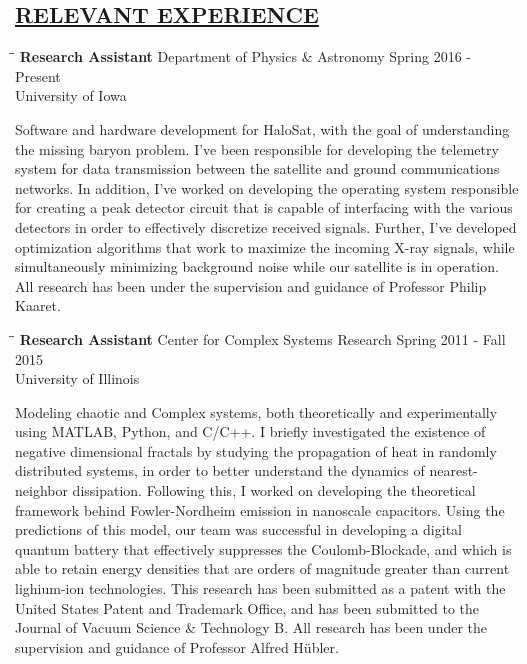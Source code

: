\documentclass{res}
\begin{document}
\begin{resume}
\section{\underline{RELEVANT EXPERIENCE}}
\vspace{1.5mm}
   \begin{tabbing}
   \hspace{1.75in}\= \hspace{2.75in}\= \kill %
    {\bf Research Assistant} \> Department of Physics \& Astronomy\> Spring 2016 - Present\\
                             \> University of Iowa
   \end{tabbing}\vspace{-18pt}      %
   Software and hardware development for HaloSat, with the goal of understanding the missing baryon problem. I've been responsible for developing the telemetry system for data transmission between the satellite and ground communications networks. In addition, I've worked on developing the operating system responsible for creating a peak detector circuit that is capable of interfacing with the various detectors in order to effectively discretize received signals. Further, I've developed optimization algorithms that work to maximize the incoming X-ray signals, while simultaneously minimizing background noise while our satellite is in operation. All research has been under the supervision and guidance of Professor Philip Kaaret.
   \vspace{-1mm}
   \begin{tabbing}
   \hspace{1.75in}\= \hspace{2.75in}\= \kill %
    {\bf Research Assistant} \>Center for Complex Systems Research \> Spring 2011 - Fall 2015\\
                             \>University of Illinois
   \end{tabbing}\vspace{-18pt}      %
    Modeling chaotic and Complex systems, both theoretically and experimentally using MATLAB, Python, and C/C++. I briefly investigated the existence of negative dimensional fractals by studying the propagation of heat in randomly distributed systems, in order to better understand the dynamics of nearest-neighbor dissipation. Following this, I worked on developing the theoretical framework behind Fowler-Nordheim emission in nanoscale capacitors. Using the predictions of this model, our team was successful in developing a digital quantum battery that effectively suppresses the Coulomb-Blockade, and which is able to retain energy densities that are orders of magnitude greater than current lighium-ion technologies. This research has been submitted as a patent with the United States Patent and Trademark Office, and has been submitted to the Journal of Vacuum Science \& Technology B. All research has been under the supervision and guidance of Professor Alfred H\"{u}bler.

\end{resume}
\end{document}
